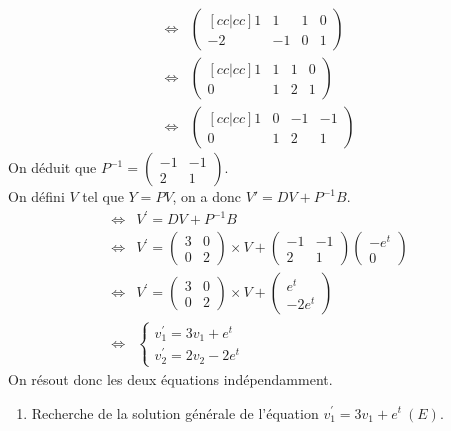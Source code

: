 \begin{ex}
\begin{align*}
    \Leftrightarrow & \begin{pmatrix}[cc|cc]
   1 & 1 & 1 & 0 \\  
   -2 & -1 & 0 & 1
 \end{pmatrix}\\
 \Leftrightarrow & \begin{pmatrix}[cc|cc]1 & 1 & 1 & 0\\
 0&1&2&1\end{pmatrix}\\
 \Leftrightarrow & \begin{pmatrix}[cc|cc]1&0&-1&-1\\0&1&2&1\end{pmatrix}
\end{align*}
On déduit que $P^{-1}=\begin{pmatrix}-1&-1\\2&1\end{pmatrix}$.\\
On défini $V$ tel que $Y=PV$, on a donc $V'=DV+P^{-1}B$.\\
\begin{align*}
    \Leftrightarrow & V^{\prime}=DV+P^{-1}B \\
    \Leftrightarrow & V^{\prime}=\begin{pmatrix}3&0\\0&2\end{pmatrix}\times V +\begin{pmatrix}-1&-1\\2&1\end{pmatrix}\begin{pmatrix}-e^t\\0\end{pmatrix}\\
    \Leftrightarrow & V^{\prime}=\begin{pmatrix}3&0\\0&2\end{pmatrix}\times V +\begin{pmatrix}e^t\\-2e^t\end{pmatrix}\\
    \Leftrightarrow & \begin{cases}
    v_1^{\prime}=3v_1+e^t\\
    v_2^{\prime}=2v_2-2e^t
    \end{cases}
\end{align*}
On résout donc les deux équations indépendamment.
\begin{enumerate}
    \item Recherche de la solution générale de l'équation $v_1^{\prime}=3v_1+e^t\ (E)$.

\end{enumerate}
\end{ex}
